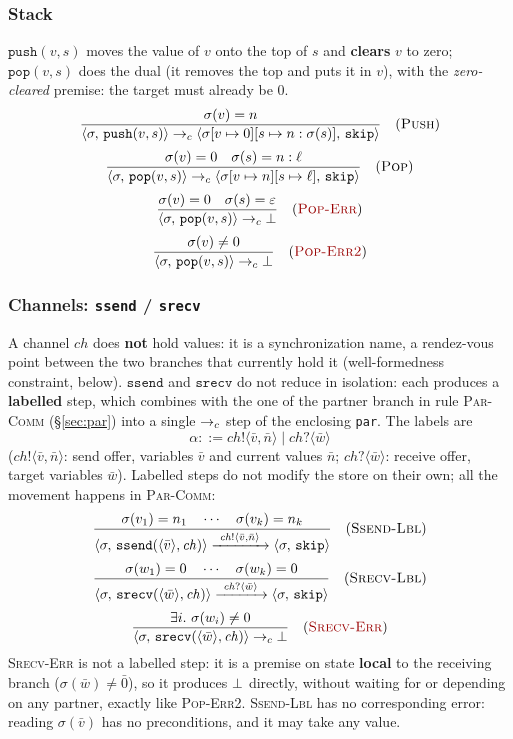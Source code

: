 \subsubsection{Stack}
\label{sec:stack}
$\mathtt{push}(v,s)$ moves the value of $v$ onto the top of $s$ and \textbf{clears} $v$ to zero;
$\mathtt{pop}(v,s)$ does the dual (it removes the top and puts it in $v$), with the
\emph{zero-cleared} premise: the target must already be $0$.
\[
\dfrac{\sigma(v) = n}
      {\cfg{\mathtt{push}(v,s)}{\sigma} \toc \cfg{\mathtt{skip}}{\upd{\upd{\sigma}{v}{0}}{s}{n : \sigma(s)}}} \rname{Push}
\]
\[
\dfrac{\sigma(v) = 0 \quad \sigma(s) = n : \ell}
      {\cfg{\mathtt{pop}(v,s)}{\sigma} \toc \cfg{\mathtt{skip}}{\upd{\upd{\sigma}{v}{n}}{s}{\ell}}} \rname{Pop}
\]
\[
\dfrac{\sigma(v) = 0 \quad \sigma(s) = \varepsilon}
      {\cfg{\mathtt{pop}(v,s)}{\sigma} \toc \err} \rnameerr{Pop-Err}
\]
\[
\dfrac{\sigma(v) \neq 0}
      {\cfg{\mathtt{pop}(v,s)}{\sigma} \toc \err} \rnameerr{Pop-Err2}
\]

\subsubsection{Channels: \texttt{ssend} / \texttt{srecv}}
\label{sec:chan}
A channel $\mathit{ch}$ does \textbf{not} hold values: it is a synchronization
name, a rendez-vous point between the two branches that currently hold it
(well-formedness constraint, below). $\mathtt{ssend}$ and
$\mathtt{srecv}$ do not reduce in isolation: each produces a
\textbf{labelled} step, which combines with the one of the partner branch in
rule \textsc{Par-Comm} (\S\ref{sec:par}) into a single $\toc$ step of the
enclosing \texttt{par}. The labels are
\[
\alpha ::= \mathit{ch}!\langle \bar v,\bar n\rangle \mid \mathit{ch}?\langle \bar w\rangle
\]
($\mathit{ch}!\langle \bar v,\bar n\rangle$: send offer, variables
$\bar v$ and current values $\bar n$; $\mathit{ch}?\langle \bar w\rangle$:
receive offer, target variables $\bar w$). Labelled steps do not
modify the store on their own; all the movement happens in
\textsc{Par-Comm}:
\[
\dfrac{\sigma(v_1) = n_1 \quad \cdots \quad \sigma(v_k) = n_k}
      {\cfg{\mathtt{ssend}(\langle \bar v \rangle, \mathit{ch})}{\sigma}
       \xrightarrow{\ \mathit{ch}!\langle \bar v,\bar n\rangle\ } \cfg{\mathtt{skip}}{\sigma}} \rname{Ssend-Lbl}
\]
\[
\dfrac{\sigma(w_1) = 0 \quad \cdots \quad \sigma(w_k) = 0}
      {\cfg{\mathtt{srecv}(\langle \bar w \rangle, \mathit{ch})}{\sigma}
       \xrightarrow{\ \mathit{ch}?\langle \bar w\rangle\ } \cfg{\mathtt{skip}}{\sigma}} \rname{Srecv-Lbl}
\]
\[
\dfrac{\exists i.\ \sigma(w_i) \neq 0}
      {\cfg{\mathtt{srecv}(\langle \bar w \rangle, \mathit{ch})}{\sigma} \toc \err} \rnameerr{Srecv-Err}
\]
\textcolor{red!60!black}{\textsc{Srecv-Err}} is not a labelled step: it is a premise on state
\textbf{local} to the receiving branch ($\sigma(\bar w) \neq \bar 0$), so it
produces $\err$ directly, without
waiting for or depending on any partner, exactly like
\textcolor{red!60!black}{\textsc{Pop-Err2}}. \textsc{Ssend-Lbl} has no corresponding error:
reading $\sigma(\bar v)$ has no preconditions, and it may take any value.

